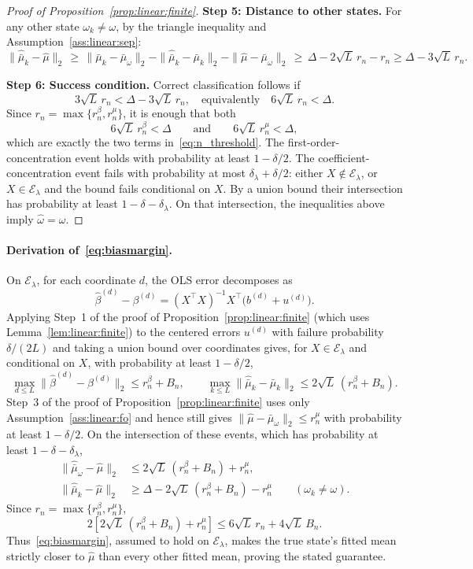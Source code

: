 \documentclass[12pt,reqno]{amsart}
\begin{document}
\begin{proof}[Proof of Proposition~\ref{prop:linear:finite}]
    \textbf{Step 5: Distance to other states.}
    For any other state $\omega_k\neq\omega$, by the triangle inequality and Assumption~\ref{ass:linear:sep}:
    \[
      \|\widehat{\bar\mu}_k-\hat\mu\|_2 \,\ge\,
      \|\bar\mu_k-\bar\mu_\omega\|_2-\|\widehat{\bar\mu}_k-\bar\mu_k\|_2-
      \|\hat\mu-\bar\mu_\omega\|_2 \,\ge\, \Delta-2\sqrt{L}\,r_n-r_n \ge \Delta-3\sqrt{L}\,r_n.
    \]

    \textbf{Step 6: Success condition.}
    Correct classification follows if
    \[
    3\sqrt{L}\,r_n < \Delta-3\sqrt{L}\,r_n,
    \quad\text{equivalently}\quad
    6\sqrt{L}\,r_n<\Delta.
    \]
    Since $r_n=\max\{r_n^\beta,r_n^\mu\}$, it is enough that both
    \[
    6\sqrt{L}\,r_n^\beta<\Delta
    \qquad\text{and}\qquad
    6\sqrt{L}\,r_n^\mu<\Delta,
    \]
    which are exactly the two terms in~\eqref{eq:n_threshold}.  The first-order-concentration event holds with probability at least $1-\delta/2$. The coefficient-concentration event fails with probability at most $\delta_\lambda+\delta/2$: either $X\notin\mathcal{E}_\lambda$, or $X\in\mathcal{E}_\lambda$ and the bound fails conditional on $X$. By a union bound their intersection has probability at least $1-\delta-\delta_\lambda$. On that intersection, the inequalities above imply $\widehat\omega=\omega$.
    \end{proof}

\paragraph{Derivation of~\eqref{eq:biasmargin}.}\label{app:biasmargin}
\begingroup
On $\mathcal{E}_\lambda$, for each coordinate $d$, the OLS error decomposes as
\[
 \widehat\beta^{(d)}-\beta^{(d)}
 =(X^{\top}X)^{-1}X^{\top}\bigl(b^{(d)}+u^{(d)}\bigr).
\]
Applying Step~1 of the proof of Proposition~\ref{prop:linear:finite} (which uses Lemma~\ref{lem:linear:finite}) to the centered errors $u^{(d)}$ with failure probability $\delta/(2L)$ and taking a union bound over coordinates gives, for $X\in\mathcal{E}_\lambda$ and conditional on $X$, with probability at least $1-\delta/2$,
\[
 \max_{d\leq L}\|\widehat\beta^{(d)}-\beta^{(d)}\|_2\leq r_n^\beta+B_n,
 \qquad
 \max_{k\leq L}\|\widehat{\bar\mu}_k-\bar\mu_k\|_2
 \leq2\sqrt L\,(r_n^\beta+B_n).
\]
Step~3 of the proof of Proposition~\ref{prop:linear:finite} uses only Assumption~\ref{ass:linear:fo} and hence still gives
$\|\hat\mu-\bar\mu_\omega\|_2\leq r_n^\mu$ with probability at least $1-\delta/2$.
On the intersection of these events, which has probability at least $1-\delta{}-\delta_\lambda$,
\begin{align*}
 \|\widehat{\bar\mu}_\omega-\hat\mu\|_2
 &\leq2\sqrt L\,(r_n^\beta+B_n)+r_n^\mu,\\
 \|\widehat{\bar\mu}_k-\hat\mu\|_2
 &\geq\Delta-2\sqrt L\,(r_n^\beta+B_n)-r_n^\mu
 \qquad(\omega_k\neq\omega).
\end{align*}
Since $r_n=\max\{r_n^\beta,r_n^\mu\}$,
\[
 2\left[2\sqrt L\,(r_n^\beta+B_n)+r_n^\mu\right]
 \leq 6\sqrt L\,r_n+4\sqrt L\,B_n.
\]
Thus~\eqref{eq:biasmargin}, assumed to hold on $\mathcal{E}_\lambda$, makes the true state's fitted mean strictly closer to $\hat\mu$ than every other fitted mean, proving the stated guarantee.
\end{document}
